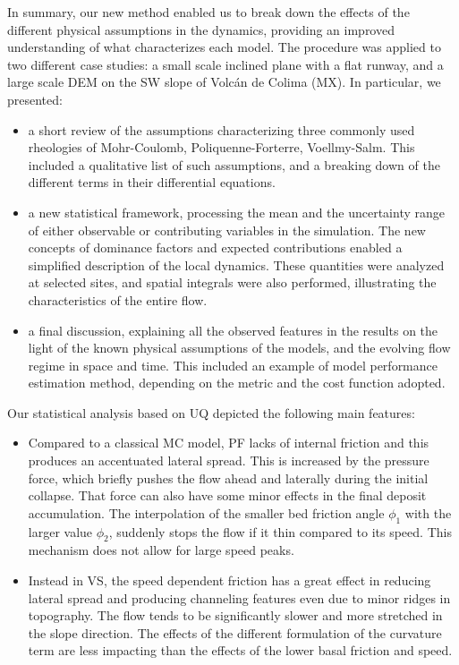 \documentclass{article}
\begin{document}
In summary, our new method enabled us to break down the effects of the different physical assumptions in the dynamics, providing an improved understanding of what characterizes each model. The procedure was applied to two different case studies: a small scale inclined plane with a flat runway, and a large scale DEM on the SW slope of Volc\'{a}n de Colima (MX). In particular, we presented:
\begin{itemize}
  \item a short review of the assumptions characterizing three commonly used rheologies of Mohr-Coulomb, Poliquenne-Forterre, Voellmy-Salm. This included a qualitative list of such assumptions, and a breaking down of the different terms in their differential equations.
  \item a new statistical framework, processing the mean and the uncertainty range of either observable or contributing variables in the simulation. The new concepts of dominance factors and expected contributions enabled a simplified description of the local dynamics. These quantities were analyzed at selected sites, and spatial integrals were also performed, illustrating the characteristics of the entire flow.
  \item a final discussion, explaining all the observed features in the results on the light of the known physical assumptions of the models, and the evolving flow regime in space and time. This included an example of model performance estimation method, depending on the metric and the cost function adopted.
\end{itemize}

Our statistical analysis based on UQ depicted the following main features:
\begin{itemize}
  \item Compared to a classical MC model, PF lacks of internal friction and this produces an accentuated lateral spread. This is increased by the pressure force, which briefly pushes the flow ahead and laterally during the initial collapse. That force can also have some minor effects in the final deposit accumulation. The interpolation of the smaller bed friction angle $\phi_1$ with the larger value $\phi_2$, suddenly stops the flow if it thin compared to its speed. This mechanism does not allow for large speed peaks.
  \item Instead in VS, the speed dependent friction has a great effect in reducing lateral spread and producing channeling features even due to minor ridges in topography. The flow tends to be significantly slower and more stretched in the slope direction. The effects of the different formulation of the curvature term are less impacting than the effects of the lower basal friction and speed.
\end{itemize}
\end{document}
